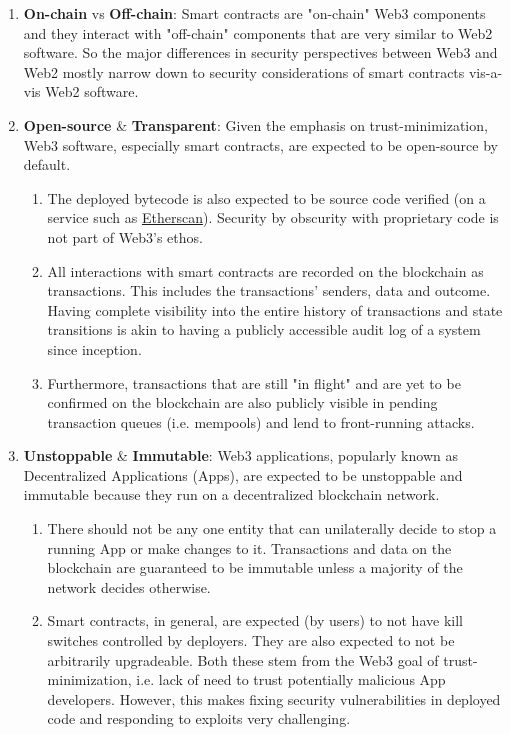 \begin{enumerate}
\item\textbf{On-chain} vs \textbf{Off-chain}: Smart contracts are "on-chain" Web3 components and they interact with "off-chain" components that are very similar to Web2 software. So the major differences in security perspectives between Web3 and Web2 mostly narrow down to security considerations of smart contracts vis-a-vis Web2 software.

\item\textbf{Open-source} \& \textbf{Transparent}: Given the emphasis on trust-minimization, Web3 software, especially smart contracts, are expected to be open-source by default.
\begin{enumerate}
\item The deployed bytecode is also expected to be source code verified (on a service such as \href{https://etherscan.io}{Etherscan}). Security by obscurity with proprietary code is not part of Web3's ethos.
\item All interactions with smart contracts are recorded on the blockchain as transactions. This includes the transactions' senders, data and outcome. Having complete visibility into the entire history of transactions and state transitions is akin to having a publicly accessible audit log of a system since inception.
\item Furthermore, transactions that are still "in flight" and are yet to be confirmed on the blockchain are also publicly visible in pending transaction queues (i.e. mempools) and lend to front-running attacks.
\end{enumerate}

\item\textbf{Unstoppable} \& \textbf{Immutable}: Web3 applications, popularly known as Decentralized Applications (\DJ Apps), are expected to be unstoppable and immutable because they run on a decentralized blockchain network.
\begin{enumerate}
\item There should not be any one entity that can unilaterally decide to stop a running \DJ App or make changes to it. Transactions and data on the blockchain are guaranteed to be immutable unless a majority of the network decides otherwise.
\item Smart contracts, in general, are expected (by users) to not have kill switches controlled by deployers. They are also expected to not be arbitrarily upgradeable. Both these stem from the Web3 goal of trust-minimization, i.e. lack of need to trust potentially malicious \DJ App developers. However, this makes fixing security vulnerabilities in deployed code and responding to exploits very challenging.
\end{enumerate}


\end{enumerate}
